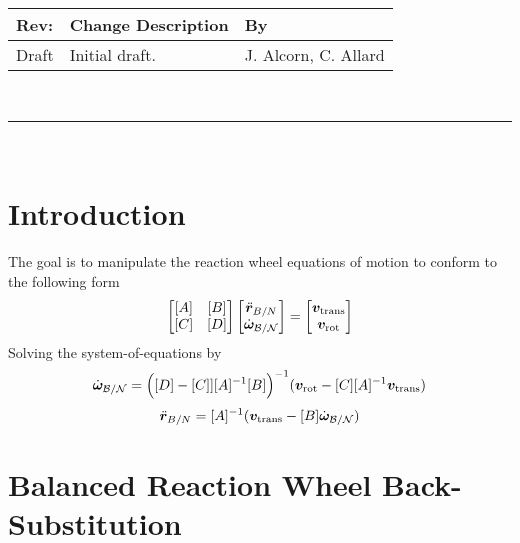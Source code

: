\documentclass[]{BasiliskReportMemo}
\begin{document}
\makeCover


%
%
\pagestyle{empty}
{\renewcommand{\arraystretch}{1.1}
\noindent
\begin{longtable}{|p{0.5in}|p{4.0in}|p{1.64in}|}
\hline
{\bfseries Rev}: & {\bfseries Change Description} & {\bfseries By} \\
\hline
Draft & Initial draft. & J. Alcorn, C. Allard \\
\hline

\end{longtable}
}

\newpage
\setcounter{page}{1}
\pagestyle{fancy}

\tableofcontents
~\\ \hrule ~\\

\section{Introduction}
The goal is to manipulate the reaction wheel equations of motion to conform to the following form
\begin{equation}
\begin{bmatrix}
[A] & [B]\\
[C] & [D]
\end{bmatrix} \begin{bmatrix}
\ddot{\bm r}_{B/N}\\
\dot{\bm\omega}_{\cal B/N}
\end{bmatrix} = \begin{bmatrix}
\bm v_{\text{trans}}\\
\bm v_{\text{rot}}
\end{bmatrix}
\end{equation}
Solving the system-of-equations by
\begin{equation}
\dot{\bm\omega}_{\cal B/N} = \Big([D] - [C]][A]^{-1}[B]\Big)^{-1}(\bm v_{\text{rot}} - [C][A]^{-1}\bm v_{\text{trans}})
\end{equation}
\begin{equation}
\ddot{\bm r}_{B/N} = [A]^{-1} (\bm v_{\text{trans}} - [B]\dot{\bm\omega}_{\cal B/N})
\end{equation}


\section{Balanced Reaction Wheel Back-Substitution}
\end{document}

